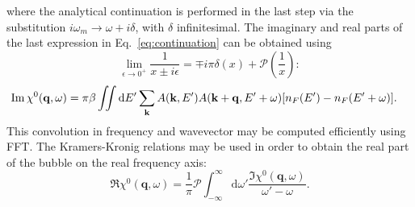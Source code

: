 \documentclass[preprint,prb,amsmath,superscriptaddress,showpacs]{revtex4}
\newcommand{\bk}{\mathbf{k}}
\newcommand{\bq}{\mathbf{q}}
\begin{document}
where the analytical continuation is performed in the last step via the
substitution $i\omega_m \rightarrow \omega + i\delta$, with $\delta$
infinitesimal. The imaginary and real parts of the last expression in
Eq.~\ref{eq:continuation} can be obtained using
%
\begin{equation}
  \lim_{\epsilon \rightarrow 0^{+}} \frac{1}{x \pm i\epsilon} = \mp
  i\pi\delta (x) + \mathcal{P}\left( \frac{1}{x} \right):
\end{equation}
%
\begin{equation}
  \begin{aligned}
    \Im \chi^0(\bq, \omega)
    &= \pi \beta
    \iint
    \mathrm{d} E'
    \sum_{\bk} A(\bk, E') 
    A(\bk + \bq, E' + \omega)
    \qty[n_F(E') - n_F(E' + \omega) ].
    \end{aligned}
\end{equation}
This convolution in frequency and wavevector may be computed
efficiently using FFT. The Kramers-Kronig relations may be used in
order to obtain the real part of the bubble on the real frequency axis:
%
\begin{equation}
  \Re \chi^0(\bq, \omega) =
  \dfrac{1}{\pi} \mathcal{P}
  \int_{-\infty}^{\infty}
  \mathrm{d} \omega' \frac{\Im \chi^0(\bq, \omega)}{\omega' - \omega}.
\end{equation}
%

\iffalse
Using RPA approximation we can further write spectral function
$A(\mathbf{k}, E)$ as
%
\begin{equation}
A(\mathbf{k}, E) = - \frac{1}{\pi} \mathrm{Im} (G_{\mathrm{ret}}(\mathbf{k}, E)) =
\frac{1}{\pi} \frac{-\mathrm{Im}(\Sigma)}{\left( E -
    \varepsilon_{\mathbf{k}} + \mu - \mathrm{Re}(\Sigma) \right)^2 + (\mathrm{Im}(\Sigma))^2}.
\end{equation}
%
Here, $\Sigma$ marks RPA self-energy.
\fi


\end{document}
